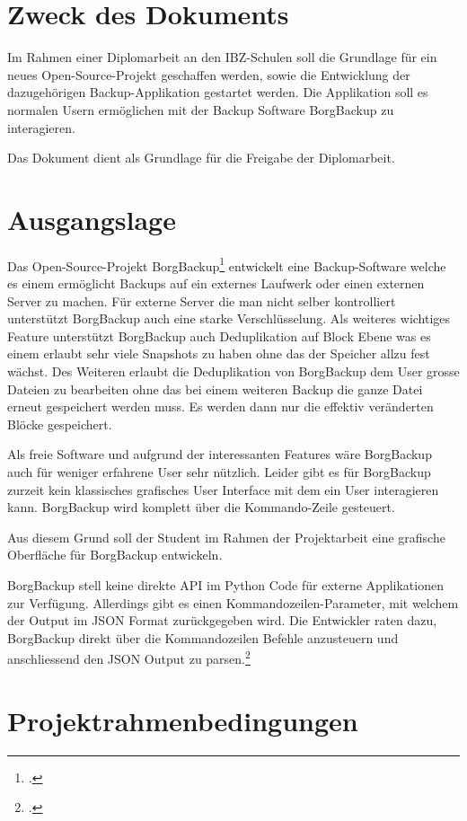 
\section{Zweck des Dokuments}
\label{sec:org61a020d}
Im Rahmen einer Diplomarbeit an den IBZ-Schulen soll die Grundlage für ein neues
Open-Source-Projekt geschaffen werden, sowie die Entwicklung der dazugehörigen
Backup-Applikation gestartet werden. Die Applikation soll es normalen Usern
ermöglichen mit der Backup Software BorgBackup zu interagieren.

Das Dokument dient als Grundlage für die Freigabe der Diplomarbeit.

\section{Ausgangslage}
\label{sec:orgc0254f3}
Das Open-Source-Projekt BorgBackup\footcite{borgbackup} entwickelt eine
Backup-Software welche es einem ermöglicht Backups auf ein externes Laufwerk
oder einen externen Server zu machen. Für externe Server die man nicht selber
kontrolliert unterstützt BorgBackup auch eine starke Verschlüsselung. Als
weiteres wichtiges Feature unterstützt BorgBackup auch Deduplikation auf Block
Ebene was es einem erlaubt sehr viele Snapshots zu haben ohne das der Speicher
allzu fest wächst. Des Weiteren erlaubt die Deduplikation von BorgBackup dem
User grosse Dateien zu bearbeiten ohne das bei einem weiteren Backup die ganze
Datei erneut gespeichert werden muss. Es werden dann nur die effektiv
veränderten Blöcke gespeichert.

Als freie Software und aufgrund der interessanten Features wäre BorgBackup auch
für weniger erfahrene User sehr nützlich. Leider gibt es für BorgBackup zurzeit
kein klassisches grafisches User Interface mit dem ein User interagieren kann.
BorgBackup wird komplett über die Kommando-Zeile gesteuert.

Aus diesem Grund soll der Student im Rahmen der Projektarbeit eine grafische
Oberfläche für BorgBackup entwickeln.

BorgBackup stell keine direkte API im Python Code für externe Applikationen zur
Verfügung. Allerdings gibt es einen Kommandozeilen-Parameter, mit welchem der
Output im JSON Format zurückgegeben wird. Die Entwickler raten dazu, BorgBackup
direkt über die Kommandozeilen Befehle anzusteuern und anschliessend den JSON
Output zu parsen.\footcite{jsonapi}

\section{Projektrahmenbedingungen}
\label{sec:org70966d8}


